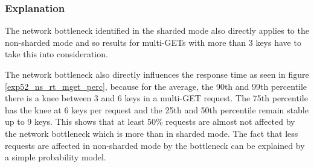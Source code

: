 \documentclass[report.tex]{subfiles}
\begin{document}


\subsubsection{Explanation}

The network bottleneck identified in the sharded mode also directly applies to the non-sharded mode and so results for multi-GETs with more than 3 keys have to take this into consideration.
 
The network bottleneck also directly influences the response time as seen in figure \ref{exp52_ns_rt_mget_perc}, because for the average, the 90th and 99th percentile there is a knee between 3 and 6 keys in a multi-GET request. The 75th percentile has the knee at 6 keys per request and the 25th and 50th percentile remain stable up to 9 keys. This shows that at least 50\% requests are almost not affected by the network bottleneck which is more than in sharded mode. The fact that less requests are affected in non-sharded mode by the bottleneck can be explained by a simple probability model.
\end{document}
